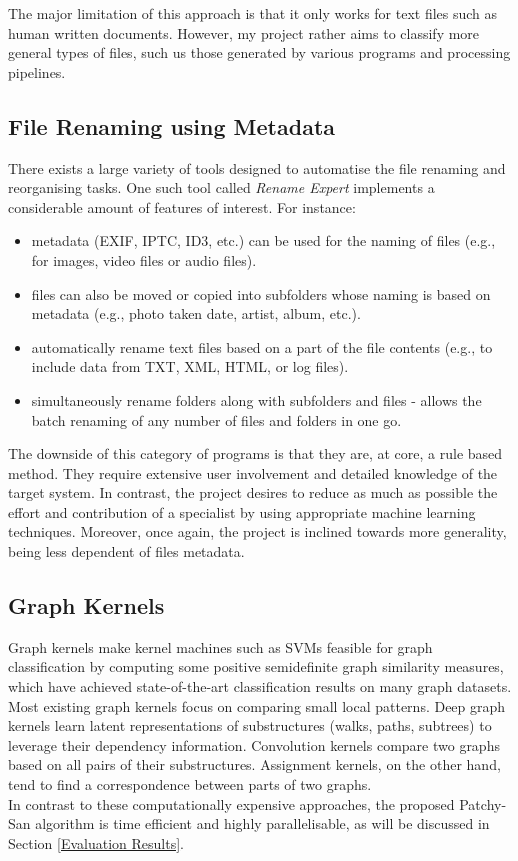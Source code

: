 The major limitation of this approach is that it only works for text files such as human written documents. However, my project rather aims to classify more general types of files, such us those generated by various programs and processing pipelines. \\

\subsection{File Renaming using Metadata}

There exists a large variety of tools designed to automatise the file renaming and reorganising tasks. One such tool called \textit{Rename Expert} implements a considerable amount of features of interest. For instance:

\begin{itemize}
  \item metadata (EXIF, IPTC, ID3, etc.) can be used for the naming of files (e.g., for images, video files or audio files).
  \item files can also be moved or copied into subfolders whose naming is based on metadata (e.g., photo taken date, artist, album, etc.).
  \item automatically rename text files based on a part of the file contents (e.g., to include data from TXT, XML, HTML, or log files).
  \item simultaneously rename folders along with subfolders and files - allows the batch renaming of any number of files and folders in one go.
\end{itemize}

The downside of this category of programs is that they are, at core, a rule based method. They require extensive user involvement and detailed knowledge of the target system. In contrast, the project desires to reduce as much as possible the effort and contribution of a specialist by using appropriate machine learning techniques. Moreover, once again, the project is inclined towards more generality, being less dependent of files metadata. \\


\subsection{Graph Kernels}

Graph kernels make kernel machines such as SVMs feasible for graph classification by computing some positive semidefinite graph similarity measures, which have achieved state-of-the-art classification results on many graph datasets. Most existing graph kernels focus on comparing small local patterns. Deep graph kernels learn latent representations of substructures (walks, paths, subtrees) to leverage their dependency information. Convolution kernels compare two graphs based on all pairs of their substructures. Assignment kernels, on the other hand, tend to find a correspondence between parts of two graphs. \\

In contrast to these computationally expensive approaches, the proposed Patchy-San algorithm is time efficient and highly parallelisable, as will be discussed in Section \ref{Evaluation Results}.

